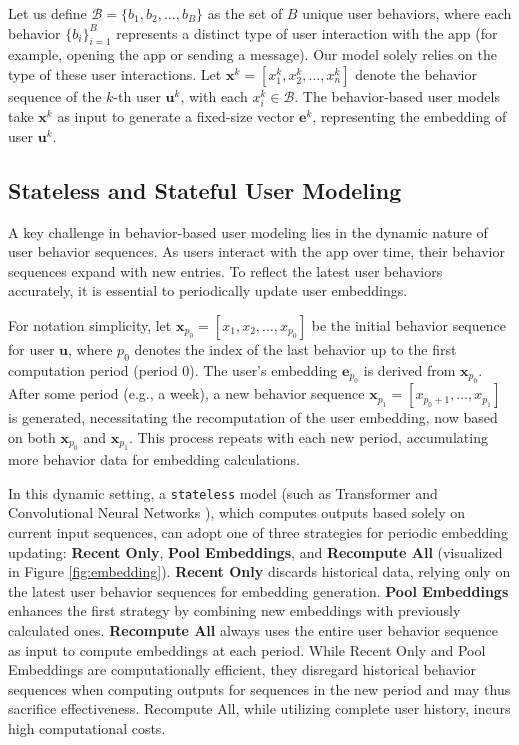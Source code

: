 \documentclass{article}
\begin{document}
Let us define $\mathcal{B} = \{b_1, b_2, \ldots, b_B\}$ as the set of $B$ unique user behaviors, where each behavior $\{b_i\}_{i=1}^B$ represents a distinct type of user interaction with the app (for example, opening the app or sending a message). Our model solely relies on the type of these user interactions. Let $\bm{x}^k = [x_1^k,x_2^k,\ldots,x_n^k]$ denote the behavior sequence of the $k$-th user $\bm{u}^k$, with each $x_i^k \in \mathcal{B}$. The behavior-based user models take $\bm{x}^k$ as input to generate a fixed-size vector $\bm{e}^k$, representing the embedding of user $\bm{u}^k$.


\subsection{Stateless and Stateful User Modeling}

A key challenge in behavior-based user modeling lies in the dynamic nature of user behavior sequences. As users interact with the app over time, their behavior sequences expand with new entries. To reflect the latest user behaviors accurately, it is essential to periodically update user embeddings.

For notation simplicity, let $\bm{x}_{p_0} = [x_1,x_2,\ldots,x_{p_0}]$ be the initial behavior sequence for user $\bm{u}$, where $p_0$ denotes the index of the last behavior up to the first computation period (period $0$). The user's embedding $\bm{e}_{p_0}$ is derived from $\bm{x}_{p_0}$. After some period (e.g., a week), a new behavior sequence $\bm{x}_{p_1} = [x_{p_0+1},\ldots,x_{p_1}]$ is generated, necessitating the recomputation of the user embedding, now based on both $\bm{x}_{p_0}$ and $\bm{x}_{p_1}$. This process repeats with each new period, accumulating more behavior data for embedding calculations.

In this dynamic setting, a \texttt{stateless} model (such as Transformer \citep{transformer} and Convolutional Neural Networks \citep{resnet}), which computes outputs based solely on current input sequences, can adopt one of three strategies for periodic embedding updating: \textbf{Recent Only}, \textbf{Pool Embeddings}, and \textbf{Recompute All} (visualized in Figure \ref{fig:embedding}).
\textbf{Recent Only} discards historical data, relying only on the latest user behavior sequences for embedding generation. \textbf{Pool Embeddings} enhances the first strategy by combining new embeddings with previously calculated ones. \textbf{Recompute All} always uses the entire user behavior sequence as input to compute embeddings at each period. While Recent Only and Pool Embeddings are computationally efficient, they disregard historical behavior sequences when computing outputs for sequences in the new period and may thus sacrifice effectiveness. Recompute All, while utilizing complete user history, incurs high computational costs.
\end{document}
